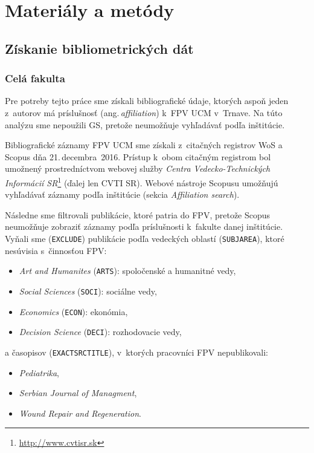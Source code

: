 \chapter{Materiály a metódy}
\label{chap:methods}

\section{Získanie bibliometrických dát}

\subsection{Celá fakulta}
\label{sec.all.mining}

Pre potreby tejto práce sme získali bibliografické údaje, ktorých aspoň jeden
z~autorov má príslušnosť (ang.\,\emph{affiliation}) k~FPV UCM v~Trnave.  Na túto
analýzu sme nepoužili GS, pretože neumožňuje vyhľadávať podľa inštitúcie.

Bibliografické záznamy FPV UCM sme získali z~citačných registrov WoS a Scopus
dňa 21.\,decembra~2016.  Prístup k~obom citačným registrom bol umožnený
prostredníctvom webovej služby \emph{Centra Vedecko-Technických Informácií
  SR}\footnote{\url{http://www.cvtisr.sk}} (ďalej len CVTI SR).  Webové nástroje
Scopusu umožňujú vyhľadávať záznamy podľa inštitúcie (sekcia \emph{Affiliation
  search}).

Následne sme filtrovali publikácie, ktoré patria do FPV, pretože Scopus
neumožňuje zobraziť záznamy podľa príslušnosti k~fakulte danej inštitúcie.
Vyňali sme (\texttt{EXCLUDE}) publikácie podľa vedeckých oblastí
(\texttt{SUBJAREA}), ktoré nesúvisia s~činnosťou FPV:

\begin{itemize}
\item \emph{Art and Humanites} (\texttt{ARTS}): spoločenské a humanitné vedy,
\item \emph{Social Sciences} (\texttt{SOCI}): sociálne vedy,
\item \emph{Economics} (\texttt{ECON}): ekonómia,
\item \emph{Decision Science} (\texttt{DECI}): rozhodovacie vedy,
\end{itemize}
a časopisov (\texttt{EXACTSRCTITLE}), v~ktorých pracovníci FPV nepublikovali:

\begin{itemize}
\item \emph{Pediatrika},
\item \emph{Serbian Journal of Managment},
\item \emph{Wound Repair and Regeneration}.
\end{itemize}

